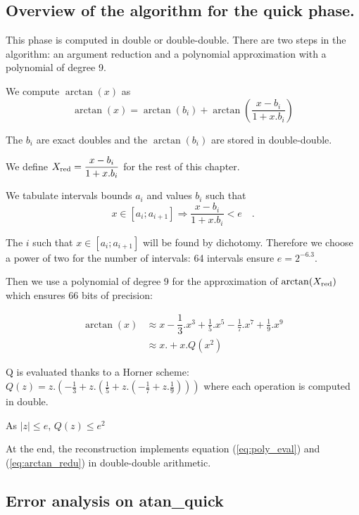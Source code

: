 \subsection{Overview of the algorithm for the quick phase.}

This phase is computed in double or double-double. There are two steps
in the algorithm: an argument reduction and a polynomial approximation
with a polynomial of degree 9.

We compute $\arctan(x)$ as 
\begin{equation}
\arctan(x) = \arctan( b_i ) + \arctan(\frac{x-b_i}{1+x.b_i}) \label{eq:arctan_redu}
\end{equation}

The $b_i$ are exact doubles and the $\arctan(b_i)$ are stored in
double-double.

We define $X_{\mathrm{red}} = \dfrac{x-b_i}{1+x.b_i}$ for the rest of this chapter.

We tabulate intervals bounds $a_i$ and values $b_i$ such
that 
\begin{equation}
 x \in [a_i;a_{i+1}] \Rightarrow \dfrac{x-b_i}{1+x.b_i} < e \quad .
\label{atan_ineq_interval}
\end{equation}

The $i$ such that $x \in [a_i;a_{i+1}]$ will be found by dichotomy.
Therefore we choose a power of two for the number of intervals: 64
intervals ensure $e=2^{-6.3}$.

Then we use a polynomial of degree 9 for the approximation of $\arctan(X_{\mathrm{red}})$
which ensures 66 bits of precision:

\begin{equation}
\begin{split} \arctan(x)& \approx x - \dfrac{1}{3} .x^3 + \frac{1}{5}.x^5
- \frac{1}{7}.x^7 + \frac{1}{9}.x^9 \nonumber \\ 
  & \approx x . + x.Q(x^2)
\end{split}
\label{eq:poly_eval}
\end{equation}
 
Q is evaluated thanks to a Horner scheme:
$ Q(z) = z. (-\frac{1}{3} + z.(\frac{1}{5} + z.(-\frac{1}{7} +
z.\frac{1}{9}))) $
where each operation is computed in double.

As $|z| \leq e$, $Q(z) \leq e^2$

At the end, the reconstruction implements equation
(\ref{eq:poly_eval}) and (\ref{eq:arctan_redu}) in double-double
arithmetic.


\subsection{Error analysis on atan\_quick}

